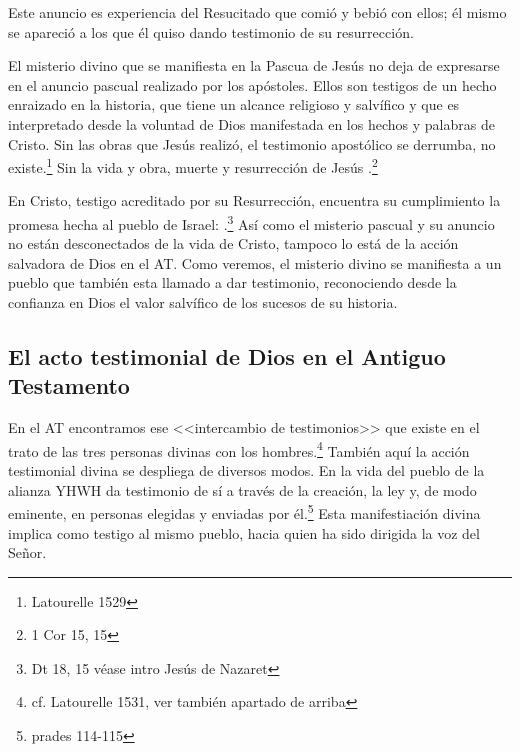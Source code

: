 Este anuncio es experiencia del Resucitado que comió y bebió con ellos;
él mismo se apareció a los que él quiso dando testimonio de su
resurrección. 

El misterio divino que se manifiesta en la Pascua de Jesús no deja de expresarse
en el anuncio pascual realizado por los apóstoles. Ellos son testigos de un
hecho enraizado en la historia, que tiene un alcance religioso y salvífico y que
es interpretado desde la voluntad de Dios manifestada en los hechos y palabras
de Cristo. Sin las obras que Jesús realizó, el testimonio apostólico se
derrumba, no existe.\footnote{Latourelle 1529} Sin la vida y obra, muerte y
resurrección de Jesús .\footnote{1 Cor 15, 15}

En Cristo, testigo acreditado por su Resurrección, encuentra su cumplimiento
la promesa hecha al pueblo de Israel: .\footnote{Dt 18, 15 véase intro Jesús de Nazaret} Así
como el misterio pascual y su anuncio no están desconectados de la vida de
Cristo, tampoco lo está de la acción salvadora de Dios en el AT. Como veremos,
el misterio divino se manifiesta a un pueblo que también esta llamado a dar
testimonio, reconociendo desde la confianza en Dios el valor salvífico de los
sucesos de su historia.



\subsection{El acto testimonial de Dios en el Antiguo Testamento}

En el AT encontramos ese <<intercambio de testimonios>> que existe en el trato
de las tres personas divinas con los hombres.\footnote{cf. Latourelle 1531, ver
  también apartado de arriba} También aquí la acción testimonial divina se
despliega de diversos modos. En la vida del pueblo de la alianza YHWH da
testimonio de sí a través de la creación, la ley y, de modo eminente, en
personas elegidas y enviadas por él.\footnote{prades 114-115} Esta
manifestiación divina implica como testigo al mismo pueblo, hacia quien ha sido
dirigida la voz del Señor.

